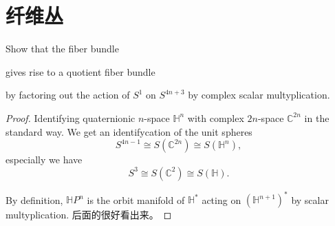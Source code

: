 \chapter{纤维丛}
    \begin{problem}
        Show that the fiber bundle
        \begin{center}
        \end{center}
        gives rise to a quotient fiber bundle 
        \begin{center}
        \end{center}
        by factoring out the action of $S^1$ on $S^{4n+3}$ by complex scalar multyplication.
    \end{problem}
    \begin{proof}
        Identifying quaternionic $n$-space $\mathbb{H}^n$ with complex $2n$-space $\mathbb{C}^{2n}$ in the standard way. 
        We get an identifycation of the unit spheres
        \begin{equation*}
            S^{4n-1}\cong S(\mathbb{C}^{2n})\cong S(\mathbb{H}^n),
        \end{equation*}
        especially we have
        \begin{equation*}
            S^3\cong S(\mathbb{C}^2)\cong S(\mathbb{H}).
        \end{equation*}

        By definition, $\mathbb{H}P^n$ is the orbit manifold of $\mathbb{H}^*$ acting on $(\mathbb{H}^{n+1})^*$ by scalar multyplication.
        后面的很好看出来。
    \end{proof}
